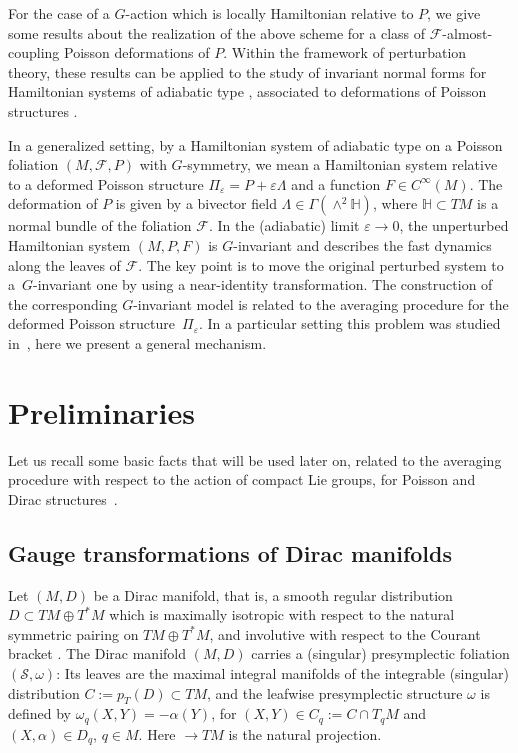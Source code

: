 \documentclass[10pt,a4paper]{amsart}
\numberwithin{equation}{section}
\begin{document}
For the case of a $G$-action which is locally Hamiltonian relative to $P$, we give some results about the realization of the above scheme for a class of $\mathcal{F}$-almost-coupling Poisson deformations of $P$. Within the framework of perturbation theory, these results can be applied to the study of invariant normal forms for Hamiltonian systems of adiabatic type \cite{ArKN-88}, associated to deformations of Poisson structures \cite{MJYu-13,MYU-16}.

In a generalized setting, by a Hamiltonian system of adiabatic type on a Poisson foliation $(M,\mathcal{F},P)$ with $G$-symmetry, we mean a Hamiltonian system relative to a deformed Poisson structure $\Pi_{\varepsilon}=P+\varepsilon \Lambda$ and a function $F\in C^{\infty}(M)$. The deformation of $P$ is given by a bivector f\/ield $\Lambda\in\Gamma(\wedge^{2}\mathbb{H})$, where $\mathbb{H}\subset TM$ is a normal bundle of the foliation $\mathcal{F}$. In the (adiabatic) limit $\varepsilon\to 0$, the unperturbed Hamiltonian system $(M,P,F)$ is $G$-invariant and describes the fast dynamics along the leaves of $\mathcal{F}$. The key point is to move the original perturbed system to a~$G$-invariant one by using a near-identity transformation. The construction of the corresponding $G$-invariant model is related to the averaging procedure for the deformed Poisson structure~$\Pi_{\varepsilon}$. In a particular setting this problem was studied in~\cite{MYU-16}, here we present a general mechanism.

\section{Preliminaries}

Let us recall some basic facts that will be used later on, related to the averaging procedure with respect to the action of compact Lie groups, for Poisson and Dirac structures~\cite{JVYV-14}.

\subsection{Gauge transformations of Dirac manifolds}
Let $(M,D)$ be a Dirac manifold, that is, a smooth regular distribution $D\subset TM\oplus T^{\ast}M$ which is maximally isotropic with respect to the natural symmetric pairing on $TM\oplus T^{\ast}M$, and involutive with respect to the Courant bracket \cite{Cou-90,CuWe-86}. The Dirac manifold $(M,D)$ carries a (singular) presymplectic foliation $(\mathcal{S},\omega)$: Its leaves are the maximal integral manifolds of the integrable (singular) distribution $C:=p_{T}(D)\subset TM$, and the leafwise presymplectic structure $\omega$ is def\/ined by $\omega_{q}(X,Y)=-\alpha(Y)$, for $(X,Y)\in C_{q}:=C\cap T_qM$ and $(X,\alpha)\in D_{q}$, $q\in M$. Here  $\rightarrow TM$ is the natural projection.
\end{document}
